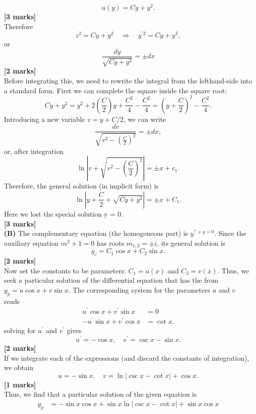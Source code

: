 \documentclass[11pt,a4paper]{article}
\begin{document}
\begin{enumerate}
		$$
		u(y) = Cy + y^2.
		$$
		\hfill\textbf{[3 marks]}\\
		Therefore
		$$
		z^2 = Cy + y^2\quad\Rightarrow\quad y^{\prime 2} = Cy + y^2,
		$$
		or
		$$
		\frac{dy}{\sqrt{Cy + y^2}} = \pm dx
		$$
		\hfill\textbf{[2 marks]}\\
		Before integrating this, we need to rewrite the integral from the lefthand-side into a standard form. First we can complete the square inside the square root:
		$$
		Cy + y^2 = y^2 + 2\left(\frac{C}{2}\right)y + \frac{C^2}{4} - \frac{C^2}{4} = \left(y + \frac{C}{2}\right)^2 - \frac{C^2}{4}.
		$$
		Introducing a new variable $v = y + C/2$, we can write
		$$
		\frac{dv}{\sqrt{v^2 - \left(\frac{C}{2}\right)^2}} = \pm dx,
		$$
		or, after integration
		$$
		\ln \left| v + \sqrt{v^2 - \left(\frac{C}{2}\right)^2}\right| = \pm x + c_1.
		$$
		Therefore, the general solution (in implicit form) is
		$$
		\ln \left| y + \frac{C}{2} + \sqrt{Cy+y^2} \right| = \pm x + C_1.
		$$
		Here we lost the special solution y = 0.\\
		\hspace*{0pt}\hfill\textbf{[3 marks]}\\
		\textbf{(B)} The complementary equation (the homogeneous part) is $y^{\prime\prime + y = 0}$.  Since the auxiliary equation $m^2 + 1 = 0$ has roots $m_{1,2} = \pm i$, its general solution is
		$$
		y_c = C_1 \cos x + C_2\sin x.
		$$
		\hfill\textbf{[2 marks]}\\
		Now set the constants to be parameters: $C_1 = u(x)$ and $C_2 = v(x)$. Thus, we seek a particular solution of the differential equation that has the from $y_p = u\cos x + v\sin x$. The corresponding system for the parameters $u$ and $v$ reads
		\begin{align*}
			u^\prime \cos x + v^\prime \sin x &= 0\\
			-u^\prime \sin x + v^\prime \cos x &= \cot x.
		\end{align*}
		solving for $u^\prime$ and $v^\prime$ gives
		$$
		u^\prime = -\cos x,\quad v^\prime = \csc x - \sin x. 
		$$
		\hfill\textbf{[2 marks]}\\
		If we integrate each of the expressions (and discard the constants of integration), we obtain
		$$
		u = -\sin x,\quad v = \ln |\csc x - \cot x| + \cos x.
		$$
		\hfill\textbf{[1 marks]}\\
		Thus, we find that a particular solution of the given equation is
		\begin{align*}
			y_p &= -\sin x \cos x + \sin x \ln |\csc x - \cot x| + \sin x \cos x\\

\end{align*}
\end{enumerate}
\end{document}
